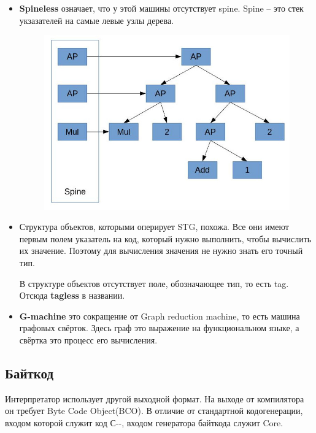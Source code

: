 \documentclass[fontsize=14pt, paper=a4, pagesize, DIV=calc]{scrartcl}
\begin{document}
\begin{itemize}

\item \textbf{Spineless} означает, что у этой машины отсутствует spine. Spine -- это стек
укзазателей на самые левые узлы дерева.

\begin{figure}[H]
\centering
\includegraphics[scale=0.7]{spine.jpg}
\end{figure}

\item Структура объектов, которыми оперирует STG, похожа. Все они имеют первым
полем указатель на код, который нужно выполнить, чтобы вычислить их значение.
Поэтому для вычисления значения не нужно знать его точный тип. 

В структуре объектов отсутствует поле, обозначающее тип, то есть tag. Отсюда
\textbf{tagless} в
названии.

\item \textbf{G-machine} это сокращение от Graph reduction machine, то есть
машина графовых свёрток. Здесь граф это выражение на функциональном языке, а
свёртка это процесс его вычисления.

\end{itemize}

\subsection{Байткод}

Интерпретатор использует другой выходной формат. На выходе от компилятора он
требует Byte Code Object(BCO). В отличие от стандартной кодогенерации, входом
которой служит код С-{}-, входом генератора байткода служит Core.
\end{document}
